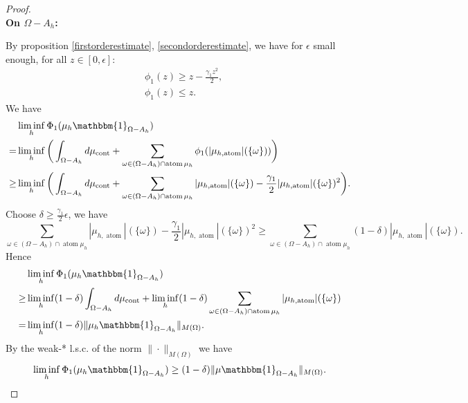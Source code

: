\documentclass[12pt,fleqn]{amsart}
\theoremstyle{definition}
\DeclareMathOperator*{\atom}{atom}
\DeclareMathOperator*{\cont}{cont}
\begin{document}
\begin{proof}
	\quad\\
	\textbf{On $\Omega - A_h$:} \par
	By proposition \ref{firstorderestimate}, \ref{secondorderestimate}, we have for $\epsilon$ small enough, for all $z \in [0, \epsilon]$:
	\begin{equation*}
		\begin{aligned}
			&\phi_1(z) \ge z - \frac{\gamma_1 z^2}{2}, \\
			&\phi_1(z) \le z.
		\end{aligned}
	\end{equation*}
	We have
	\begin{equation*}
	\begin{aligned}
		&\liminf_h \Phi_1(\mu_h \mathbbm{1}_{\Omega - A_h}) \\
		= & \liminf_h \bigg( \int_{\Omega - A_h} d\mu_{\cont} + \sum_{\omega \in (\Omega - A_h) \cap \atom \mu_h} \phi_1(|\mu_{h, \atom}|(\{\omega\})) \bigg)\\
		\ge & \liminf_h \bigg( \int_{\Omega - A_h} d\mu_{\cont} + \sum_{\omega \in (\Omega - A_h) \cap \atom \mu_h} |\mu_{h, \atom}|(\{\omega\})  - \frac{\gamma_1}{2} |\mu_{h, \atom}|(\{\omega\})^2  \bigg).
	\end{aligned}
	\end{equation*}
	Choose $\delta \ge \frac{\gamma_1}{2} \epsilon$, we have
	\begin{equation*}
		\sum_{\omega \in (\Omega - A_h) \cap \atom \mu_h} |\mu_{h, \atom}|(\{\omega\})  - \frac{\gamma_1}{2} |\mu_{h, \atom}|(\{\omega\})^2
		\ge \sum_{\omega \in (\Omega - A_h) \cap \atom \mu_h} ( 1 - \delta) |\mu_{h, \atom}|(\{\omega\}).
	\end{equation*}
	Hence
	\begin{equation*}
		\begin{aligned}
			&\liminf_h \Phi_1(\mu_h \mathbbm{1}_{\Omega - A_h}) \\
			\ge & \liminf_h (1 - \delta) \int_{\Omega - A_h} d\mu_{\cont} + \liminf_h( 1 - \delta) \sum_{\omega \in (\Omega - A_h) \cap \atom \mu_h} |\mu_{h, \atom}|(\{\omega\})\\
			= & \liminf_h (1 - \delta) \|\mu_h \mathbbm{1}_{\Omega - A_h}\|_{M(\Omega)}.
		\end{aligned}
	\end{equation*}
	By the weak-* l.s.c. of the norm $\|\cdot\|_{M(\Omega)}$ we have
	\begin{equation*}
		\liminf_h \Phi_1(\mu_h \mathbbm{1}_{\Omega - A_h}) \ge (1 - \delta) \|\mu \mathbbm{1}_{\Omega - A_h}\|_{M(\Omega)}.

\end{equation*}
\end{proof}
\end{document}
